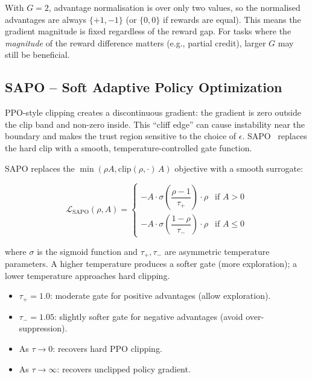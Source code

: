 \begin{warningbox}
With $G=2$, advantage normalisation is over only two values, so the normalised advantages are always $\{+1, -1\}$ (or $\{0, 0\}$ if rewards are equal). This means the gradient magnitude is fixed regardless of the reward gap. For tasks where the \emph{magnitude} of the reward difference matters (e.g., partial credit), larger $G$ may still be beneficial.
\end{warningbox}

\subsection{SAPO -- Soft Adaptive Policy Optimization}
\label{sec:sapo}

\begin{intuitionbox}
PPO-style clipping creates a discontinuous gradient: the gradient is zero outside the clip band and non-zero inside. This ``cliff edge'' can cause instability near the boundary and makes the trust region sensitive to the choice of $\epsilon$. SAPO~\cite{han2025sapo} replaces the hard clip with a smooth, temperature-controlled gate function.
\end{intuitionbox}

SAPO replaces the $\min(\rho A, \mathrm{clip}(\rho,\cdot)\,A)$ objective with a smooth surrogate:

\[
\boxed{
    \mathcal{L}_{\text{SAPO}}(\rho, A) =
    \begin{cases}
      -A \cdot \sigma\!\left(\dfrac{\rho - 1}{\tau_+}\right) \cdot \rho
        & \text{if } A > 0 \\[8pt]
      -A \cdot \sigma\!\left(\dfrac{1 - \rho}{\tau_-}\right) \cdot \rho
        & \text{if } A \le 0
    \end{cases}
  }
\]

where $\sigma$ is the sigmoid function and $\tau_+, \tau_-$ are asymmetric temperature parameters. A higher temperature produces a softer gate (more exploration); a lower temperature approaches hard clipping.

\begin{keybox}
\begin{itemize}
  \item $\tau_+ = 1.0$: moderate gate for positive advantages (allow exploration).
  \item $\tau_- = 1.05$: slightly softer gate for negative advantages (avoid over-suppression).
  \item As $\tau \to 0$: recovers hard PPO clipping.
  \item As $\tau \to \infty$: recovers unclipped policy gradient.
\end{itemize}
\end{keybox}

